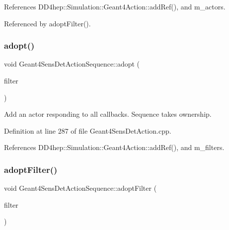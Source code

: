 References D\+D4hep\+::\+Simulation\+::\+Geant4\+Action\+::add\+Ref(), and m\+\_\+actors.



Referenced by adopt\+Filter().

\hypertarget{class_d_d4hep_1_1_simulation_1_1_geant4_sens_det_action_sequence_a89fcbc8c65a95890ea349087ac4834ec}{}\label{class_d_d4hep_1_1_simulation_1_1_geant4_sens_det_action_sequence_a89fcbc8c65a95890ea349087ac4834ec} 
\subsubsection{\texorpdfstring{adopt()}{adopt()}\hspace{0.1cm}{\footnotesize\ttfamily [2/2]}}
{\footnotesize\ttfamily void Geant4\+Sens\+Det\+Action\+Sequence\+::adopt (\begin{DoxyParamCaption}\item[{\hyperlink{class_d_d4hep_1_1_simulation_1_1_geant4_filter}{Geant4\+Filter} $\ast$}]{filter }\end{DoxyParamCaption})}



Add an actor responding to all callbacks. Sequence takes ownership. 



Definition at line 287 of file Geant4\+Sens\+Det\+Action.\+cpp.



References D\+D4hep\+::\+Simulation\+::\+Geant4\+Action\+::add\+Ref(), and m\+\_\+filters.

\hypertarget{class_d_d4hep_1_1_simulation_1_1_geant4_sens_det_action_sequence_ae387c8632412ef9eec6ed9767d3ea01b}{}\label{class_d_d4hep_1_1_simulation_1_1_geant4_sens_det_action_sequence_ae387c8632412ef9eec6ed9767d3ea01b} 
\subsubsection{\texorpdfstring{adopt\+Filter()}{adoptFilter()}}
{\footnotesize\ttfamily void Geant4\+Sens\+Det\+Action\+Sequence\+::adopt\+Filter (\begin{DoxyParamCaption}\item[{\hyperlink{class_d_d4hep_1_1_simulation_1_1_geant4_action}{Geant4\+Action} $\ast$}]{filter }\end{DoxyParamCaption})}



